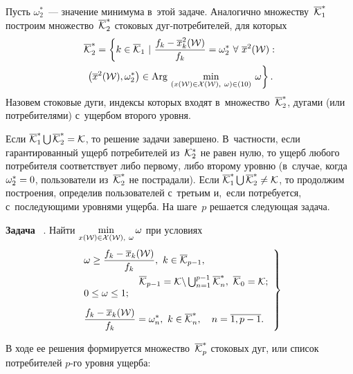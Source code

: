 \begin{multicols}{2}
Пусть $\omega^*_2$~--- значение минимума в~этой задаче. Аналогично 
множеству~$\overline {\cal K}^*_1$ построим 
множество~$\overline {\cal K}^*_2$ стоковых дуг-по\-тре\-би\-те\-лей, 
для которых
\begin{multline*}
\overline {\cal K}^*_2 = \left\{ k \in \overline{\cal K}_1 \ | \  
\fr{ f_{k} - \overline x^2_{k}({\cal W})}{f_{k}} =\omega^*_2 \ \forall \ \overline x^2({\cal W}) :\right.\\
\left.\left(\overline x^2({\cal W}), \omega^*_2\right)\in  \mathrm{Arg}\,\min\limits_{(x({\cal W}) \in {\cal X}({\cal W}), 
\ \omega) \in (10) } \: \omega \right\}. 
\end{multline*}
Назовем стоковые дуги, индексы которых входят в~множество~$\overline{\cal K}^*_2$, 
дугами (или потребителями) с~ущербом второго  уровня.

Если $\overline{\cal K}^*_1\bigcup \overline{\cal K}^*_2 \hm= {\cal K}$, то решение задачи завершено. 
В~частности, если гарантированный ущерб  потребителей из~${\cal K}^*_2$ не равен нулю, 
то ущерб любого потребителя соответствует  либо  первому, либо второму уровню 
(в~случае, когда $\omega^*_2 \hm= 0$, пользователи из~$\overline{\cal K}^*_2$ не пострадали). 
Если $\overline{\cal K}^*_1\bigcup \overline{\cal K}^*_2 \hm\neq {\cal K}$, то продолжим построения, 
определив пользователей с~третьим и,~если потребуется, с~последующими уровнями ущерба. 
На шаге~$p$ решается следующая задача.

\smallskip

\noindent
\textbf{Задача} \ {}.
Найти $\min\limits_{x({\cal W}) \in {\cal X}({\cal W}), \ \omega} \omega$
при условиях
\begin{equation}
\left.
\begin{array}{l}
 \omega \geq \displaystyle \fr{f_{k} -\overline x_{k}({\cal W})}{f_{k}},\   
 k \in \overline{\cal K}_{p-1}, \\[9pt]
\hspace*{20mm} \overline{\cal K}_{p-1} = {\cal K} \backslash 
 \bigcup_{n=1}^{p-1}  {\overline{\cal K}^*_n}, \ \overline{\cal K}_0 = {\cal K};\\
0 \le \omega \le 1; \\[9pt]
\displaystyle \fr{f_{k} - \overline x_{k}({\cal W})}{f_{k}}=\omega^*_n, \  
k \in  {\overline{\cal K}^*_n}, \quad n = \overline{1, p-1}.
\end{array}
\right\} 
                    \end{equation}


В ходе ее решения формируется множество~$\overline {\cal K}^*_p$ стоковых дуг, 
или список потребителей $p$-го уровня ущерба:


\end{multicols}
